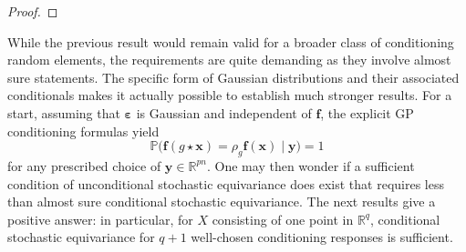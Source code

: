 \documentclass[11pt,a4paper]{article}
\newcommand{\R}{\mathbb{R}}
\newcommand{\bff}{\boldsymbol{f}}
\newcommand{\bx}{\boldsymbol{x}}
\newcommand{\by}{\boldsymbol{y}}
\newtheorem{remark}[thm]{Remark}
\begin{document}
\begin{proof}
\end{proof}

While the previous result would remain valid for a broader class of conditioning random elements, the requirements are quite demanding as they involve almost sure statements. The specific form of Gaussian distributions and their associated conditionals makes it actually possible to establish much stronger results. For a start, assuming that $\boldsymbol{\varepsilon}$ is Gaussian and independent of $\bff$, the explicit GP conditioning formulas yield
\begin{equation}
\mathbb{P}\bigl(\bff(g\star \bx)=\rho_g\bff(\bx)\mid \by\bigr)=1
\end{equation}
for any prescribed choice of $\by \in \R^{pn}$. One may then wonder if a sufficient condition of unconditional stochastic equivariance does exist that requires less than almost sure conditional stochastic equivariance. The next results give a positive answer: in particular, for $X$ consisting of one point in $\R^q$, conditional stochastic equivariance for $q+1$ well-chosen conditioning responses is sufficient.




\end{document}
